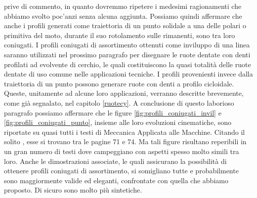 prive di commento, in quanto dovremmo ripetere i medesimi
ragionamenti che abbiamo svolto poc'anzi senza alcuna aggiunta.
Possiamo quindi affermare che anche i profili generati
come traiettoria di un punto solidale a una delle polari o primitiva del moto,
durante il suo rotolamento sulle rimanenti,
sono tra loro coniugati. 
I profili coniugati di assortimento ottenuti come inviluppo
di una linea saranno utilizzati nel prossimo paragrafo per disegnare
le ruote dentate con denti profilati ad evolvente di cerchio,
le quali costituiscono la quasi totalit\`a delle ruote dentate di
uso comune nelle applicazioni tecniche.
I profili provenienti invece dalla traiettoria di un punto possono
generare ruote con denti a profilo
cicloidale. Queste, unitamente ad alcune loro applicazioni,
verranno descritte brevemente, come gi\`a segnalato, nel capitolo
\ref{ruotecy}.
A conclusione di questo laborioso paragrafo possiamo affermare
che le figure \ref{fig:profili_coniugati_invil} e
\ref{fig:profili_coniugati_punto}, insieme alle loro evoluzioni cinematiche,
sono riportate su quasi
tutti i testi di Meccanica Applicata alle Macchine. Citando il solito
\cite{sesini1}, esse si trovano tra le pagine 71 e 74. Ma tali figure
risultano reperibili in un gran numero di testi
dove campeggiano con aspetti spesso molto simili tra loro. Anche le dimostrazioni
associate, le quali assicurano la possibilit\`a di
 ottenere profili coniugati di 
assortimento, si somigliano tutte e probabilmente sono maggiormente
 valide ed eleganti, confrontate con quella che 
abbiamo proposto. Di sicuro sono molto pi\`u sintetiche.

